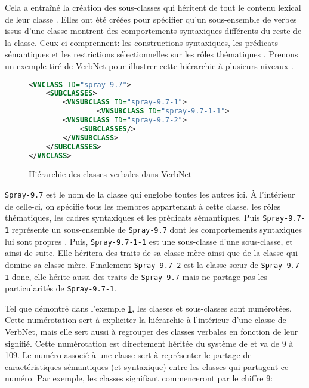 Cela a entraîné la création des sous-classes qui héritent de tout le contenu lexical de leur classe . Elles ont été créées pour spécifier qu'un sous-ensemble de verbes issus d'une classe  montrent des comportements syntaxiques différents du reste de la classe. Ceux-ci comprennent: les constructions syntaxiques, les prédicats sémantiques et les restrictions sélectionnelles sur les rôles thématiques \citep{SchulerVerbnetBroadcoverageComprehensive2005}. Prenons un exemple tiré de VerbNet pour illustrer cette hiérarchie à plusieurs niveaux \citep{CLEARVerbNetAnnotationGuidelines2005}.

\begin{figure}[htb]
  \caption{Hiérarchie des classes verbales dans VerbNet}
	\label{hierarch}
\begin{lstlisting}[language=XML]
<VNCLASS ID="spray-9.7">
    <SUBCLASSES>
        <VNSUBCLASS ID="spray-9.7-1">
                <VNSUBCLASS ID="spray-9.7-1-1">
        <VNSUBCLASS ID="spray-9.7-2">
            <SUBCLASSES/>
        </VNSUBCLASS>
    </SUBCLASSES>
</VNCLASS>
\end{lstlisting}
\end{figure}

\texttt{Spray-9.7} est le nom de la classe qui englobe toutes les autres ici. À l'intérieur de celle-ci, on spécifie tous les membres appartenant à cette classe, les rôles thématiques, les cadres syntaxiques et les prédicats sémantiques. Puis \texttt{Spray-9.7-1} représente un sous-ensemble de \texttt{Spray-9.7} dont les comportements syntaxiques lui sont propres .  Puis, \texttt{Spray-9.7-1-1} est une sous-classe d'une sous-classe, et ainsi de suite. Elle héritera des traits de sa classe mère ainsi que de la classe qui domine sa classe mère. Finalement \texttt{Spray-9.7-2} est la classe sœur de \texttt{Spray-9.7-1} donc, elle hérite aussi des traits de \texttt{Spray-9.7} mais ne partage pas les particularités de \texttt{Spray-9.7-1}.

Tel que démontré dans l'exemple \ref{hierarch}, les classes et sous-classes sont numérotées. Cette numérotation sert à expliciter la hiérarchie à l'intérieur d'une classe de VerbNet, mais elle sert aussi à regrouper des classes verbales en fonction de leur signifié. Cette numérotation est directement héritée du système de \cite{verb-classes.levin.1993} et va de 9 à 109. Le numéro associé à une classe sert à représenter le partage de caractéristiques sémantiques (et syntaxique) entre les classes qui partagent ce numéro. Par exemple, les classes signifiant  commenceront par le chiffre 9:

